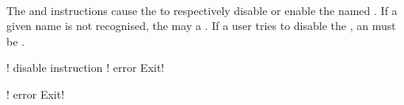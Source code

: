  \\

The  and  instructions cause the  to respectively disable or enable the named . If a given name is not recognised, the  may  a . If a user tries to disable the  , an  must be . \\

\begin{examples}
\begin{examplesource}
! disable instruction
! error Exit!
\end{examplesource}
  \begin{exampleoutput}
    ! error Exit!
  \end{exampleoutput}
\end{examples}

